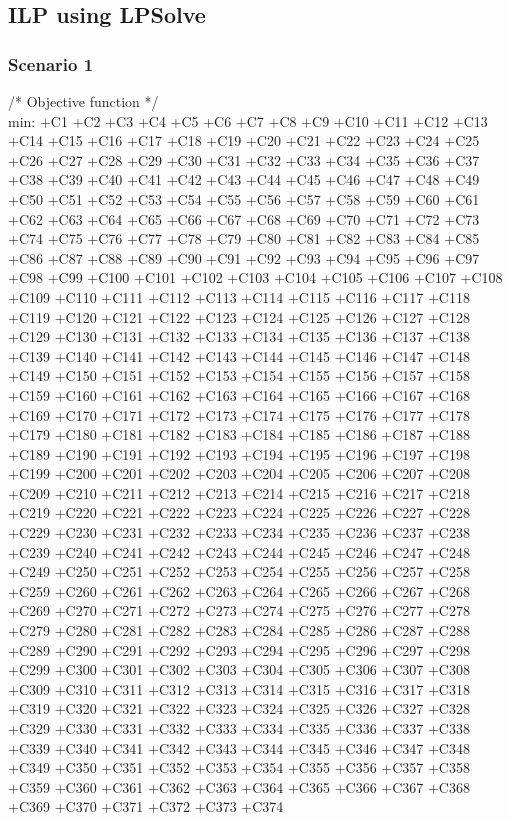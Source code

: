 \subsection{ILP using LPSolve}

\subsubsection{Scenario 1}

/* Objective function */ \\
min: +C1 +C2 +C3 +C4 +C5 +C6 +C7 +C8 +C9 +C10 +C11 +C12 +C13 +C14 +C15 +C16 +C17 +C18 +C19 +C20 +C21 +C22
 +C23 +C24 +C25 +C26 +C27 +C28 +C29 +C30 +C31 +C32 +C33 +C34 +C35 +C36 +C37 +C38 +C39 +C40 +C41 +C42
 +C43 +C44 +C45 +C46 +C47 +C48 +C49 +C50 +C51 +C52 +C53 +C54 +C55 +C56 +C57 +C58 +C59 +C60 +C61 +C62
 +C63 +C64 +C65 +C66 +C67 +C68 +C69 +C70 +C71 +C72 +C73 +C74 +C75 +C76 +C77 +C78 +C79 +C80 +C81 +C82
 +C83 +C84 +C85 +C86 +C87 +C88 +C89 +C90 +C91 +C92 +C93 +C94 +C95 +C96 +C97 +C98 +C99 +C100 +C101 +C102
 +C103 +C104 +C105 +C106 +C107 +C108 +C109 +C110 +C111 +C112 +C113 +C114 +C115 +C116 +C117 +C118 +C119
 +C120 +C121 +C122 +C123 +C124 +C125 +C126 +C127 +C128 +C129 +C130 +C131 +C132 +C133 +C134 +C135 +C136
 +C137 +C138 +C139 +C140 +C141 +C142 +C143 +C144 +C145 +C146 +C147 +C148 +C149 +C150 +C151 +C152 +C153
 +C154 +C155 +C156 +C157 +C158 +C159 +C160 +C161 +C162 +C163 +C164 +C165 +C166 +C167 +C168 +C169 +C170
 +C171 +C172 +C173 +C174 +C175 +C176 +C177 +C178 +C179 +C180 +C181 +C182 +C183 +C184 +C185 +C186 +C187
 +C188 +C189 +C190 +C191 +C192 +C193 +C194 +C195 +C196 +C197 +C198 +C199 +C200 +C201 +C202 +C203 +C204
 +C205 +C206 +C207 +C208 +C209 +C210 +C211 +C212 +C213 +C214 +C215 +C216 +C217 +C218 +C219 +C220 +C221
 +C222 +C223 +C224 +C225 +C226 +C227 +C228 +C229 +C230 +C231 +C232 +C233 +C234 +C235 +C236 +C237 +C238
 +C239 +C240 +C241 +C242 +C243 +C244 +C245 +C246 +C247 +C248 +C249 +C250 +C251 +C252 +C253 +C254 +C255
 +C256 +C257 +C258 +C259 +C260 +C261 +C262 +C263 +C264 +C265 +C266 +C267 +C268 +C269 +C270 +C271 +C272
 +C273 +C274 +C275 +C276 +C277 +C278 +C279 +C280 +C281 +C282 +C283 +C284 +C285 +C286 +C287 +C288 +C289
 +C290 +C291 +C292 +C293 +C294 +C295 +C296 +C297 +C298 +C299 +C300 +C301 +C302 +C303 +C304 +C305 +C306
 +C307 +C308 +C309 +C310 +C311 +C312 +C313 +C314 +C315 +C316 +C317 +C318 +C319 +C320 +C321 +C322 +C323
 +C324 +C325 +C326 +C327 +C328 +C329 +C330 +C331 +C332 +C333 +C334 +C335 +C336 +C337 +C338 +C339 +C340
 +C341 +C342 +C343 +C344 +C345 +C346 +C347 +C348 +C349 +C350 +C351 +C352 +C353 +C354 +C355 +C356 +C357
 +C358 +C359 +C360 +C361 +C362 +C363 +C364 +C365 +C366 +C367 +C368 +C369 +C370 +C371 +C372 +C373 +C374
